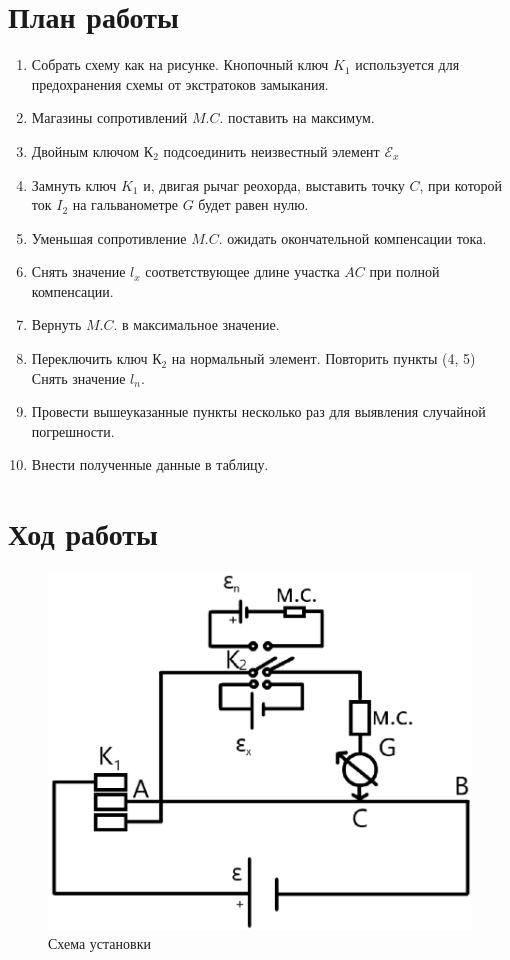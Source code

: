 \documentclass[a4paper,12pt]{article}
\begin{document}
\section{План работы}
\begin{enumerate}
\item Собрать схему как на рисунке. Кнопочный ключ $K_1$ используется для предохранения схемы от экстратоков замыкания.
\item Магазины сопротивлений $M.C.$ поставить на максимум.
\item Двойным ключом $К_2$ подсоединить неизвестный элемент $\mathcal{E}_x$ 
\item Замнуть ключ $K_1$ и, двигая рычаг реохорда, выставить точку $C$, при которой ток $I_2$ на гальванометре $G$ будет равен нулю. 
\item Уменьшая сопротивление $M.C.$ ожидать окончательной компенсации тока.
\item Снять значение $l_x$ соответствующее длине участка $AC$ при полной компенсации.
\item Вернуть $M.C.$ в максимальное значение.
\item Переключить ключ $К_2$ на нормальный элемент. Повторить пункты (4, 5) Снять значение $l_n$.
\item Провести вышеуказанные пункты несколько раз для выявления случайной погрешности.
\item Внести полученные данные в таблицу.
\end{enumerate} 



\newpage
\section{Ход работы}
\begin{figure}[!h]
	\begin{center}
		\includegraphics[scale=0.5]{scheme-2}
	\end{center}
	\caption{Схема установки}
\end{figure}
\end{document}
